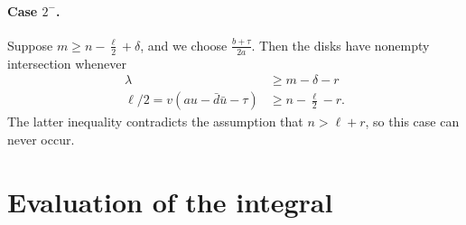 \paragraph{Case $2^-$.}
Suppose $m \geq n - \frac{\ell}{2} + \delta$, and we choose $\frac{b+\tau}{2a}$.
Then the disks have nonempty intersection whenever
\begin{align*}
  \lambda &\geq m - \delta - r \\
  \ell/2 = v(au-\bar d \bar u - \tau) & \geq n - \frac{\ell}{2} - r.
\end{align*}
The latter inequality contradicts the assumption that $n > \ell + r$,
so this case can never occur.

\newpage

\section{Evaluation of the integral}
